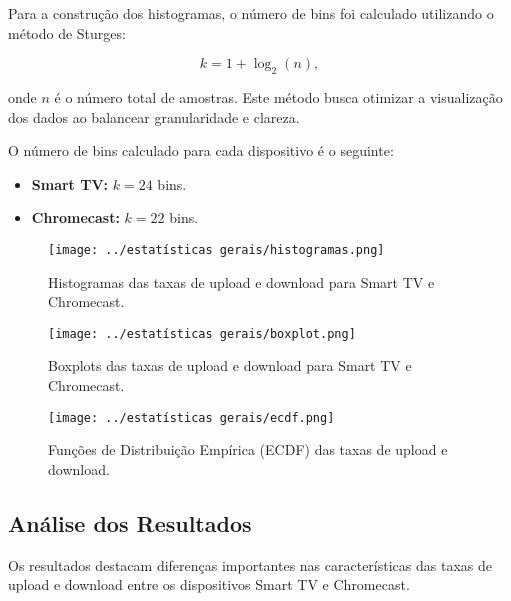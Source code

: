 Para a construção dos histogramas, o número de bins foi calculado utilizando o método de Sturges:

\begin{equation}
k = 1 + \log_2(n),
\end{equation}

onde \(n\) é o número total de amostras. Este método busca otimizar a visualização dos dados ao balancear granularidade e clareza.

O número de bins calculado para cada dispositivo é o seguinte:
\begin{itemize}
    \item \textbf{Smart TV:} \(k = 24\) bins.
    \item \textbf{Chromecast:} \(k = 22\) bins.
\end{itemize}

\begin{figure}[H]
    \centering
    \texttt{[image: ../estatísticas gerais/histogramas.png]}
    \caption{Histogramas das taxas de upload e download para Smart TV e Chromecast.}
    \label{fig:histogramas}
\end{figure}

\begin{figure}[H]
    \centering
    \texttt{[image: ../estatísticas gerais/boxplot.png]}
    \caption{Boxplots das taxas de upload e download para Smart TV e Chromecast.}
    \label{fig:boxplots}
\end{figure}

\begin{figure}[H]
    \centering
    \texttt{[image: ../estatísticas gerais/ecdf.png]}
    \caption{Funções de Distribuição Empírica (ECDF) das taxas de upload e download.}
    \label{fig:ecdf}
\end{figure}

\subsection{Análise dos Resultados}

Os resultados destacam diferenças importantes nas características das taxas de upload e download entre os dispositivos Smart TV e Chromecast.

